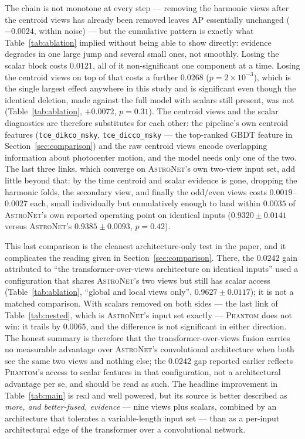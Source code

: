 \documentclass[preprint,12pt,authoryear]{elsarticle}
\newcommand{\phantomnet}{\textsc{Phantom}}
\newcommand{\astronet}{\textsc{AstroNet}}
\begin{document}
The chain is not monotone at every step --- removing the harmonic views after
the centroid views has already been removed leaves AP essentially unchanged
($-0.0024$, within noise) --- but the cumulative pattern is exactly what
Table~\ref{tab:ablation} implied without being able to show directly: evidence
degrades in one large jump and several small ones, not smoothly. Losing the
scalar block costs $0.0121$, all of it non-significant one component at a time.
Losing the centroid views on top of that costs a further $0.0268$
($p = 2\times10^{-3}$), which is the single largest effect anywhere in this
study and is significant even though the identical deletion, made against the
full model with scalars still present, was not (Table~\ref{tab:ablation},
$+0.0072$, $p = 0.31$). The centroid views and the scalar diagnostics are
therefore substitutes for each other: the pipeline's own centroid features
(\texttt{tce\_dikco\_msky}, \texttt{tce\_dicco\_msky} --- the top-ranked GBDT
feature in Section~\ref{sec:comparison}) and the raw centroid views encode
overlapping information about photocenter motion, and the model needs only one
of the two. The last three links, which converge on \astronet{}'s own two-view
input set, add little beyond that: by the time centroid and scalar evidence is
gone, dropping the harmonic folds, the secondary view, and finally the odd/even
views costs $0.0019$--$0.0027$ each, small individually but cumulatively enough
to land within $0.0035$ of \astronet{}'s own reported operating point on
identical inputs ($0.9320 \pm 0.0141$ versus \astronet{}'s $0.9385 \pm 0.0093$,
$p = 0.42$).

This last comparison is the cleanest architecture-only test in the paper, and
it complicates the reading given in Section~\ref{sec:comparison}. There, the
$0.0242$ gain attributed to ``the transformer-over-views architecture on
identical inputs'' used a configuration that shares \astronet{}'s two views but
still has scalar access (Table~\ref{tab:ablation}, ``global and local views
only'', $0.9627 \pm 0.0117$); it is not a matched comparison. With scalars
removed on both sides --- the last link of Table~\ref{tab:nested}, which is
\astronet{}'s input set exactly --- \phantomnet{} does not win: it trails by
$0.0065$, and the difference is not significant in either direction. The honest
summary is therefore that the transformer-over-views fusion carries no
measurable advantage over \astronet{}'s convolutional architecture when both
see the same two views and nothing else; the $0.0242$ gap reported earlier
reflects \phantomnet{}'s access to scalar features in that configuration, not a
architectural advantage per se, and should be read as such. The headline
improvement in Table~\ref{tab:main} is real and well powered, but its source is
better described as \emph{more, and better-fused, evidence} --- nine views plus
scalars, combined by an architecture that tolerates a variable-length input
set --- than as a per-input architectural edge of the transformer over a
convolutional network.
\end{document}
